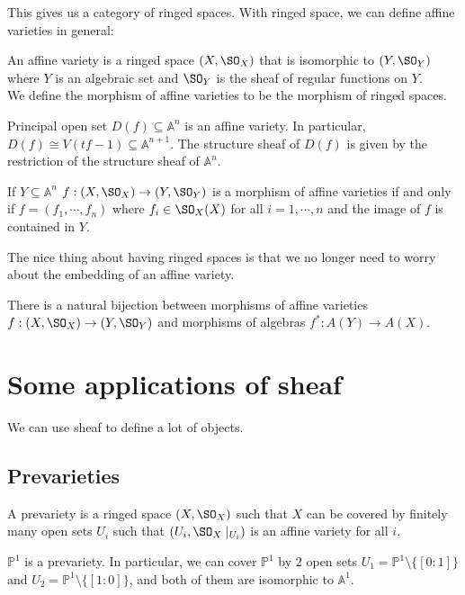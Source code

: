 \documentclass[12pt]{scrartcl}
\newcommand{\A}{\mathbb{A}}
\newcommand{\PP}{\mathbb{P}}
\begin{document}
This gives us a category of ringed spaces. With ringed space, we can define affine varieties in general: 
\begin{definition}
    An affine variety is a ringed space $(X,\SO_X)$ that is isomorphic to $(Y,\SO_Y)$ where $Y$ is an algebraic set and $\SO_Y$ is the sheaf of regular functions on $Y$.
    \\

    We define the morphism of affine varieties to be the morphism of ringed spaces.
\end{definition}
\begin{example}
    Principal open set $D(f)\subseteq \A^n$ is an affine variety. In particular, $D(f)\cong V(tf-1)\subseteq \A^{n+1}$. The structure sheaf of $D(f)$ is given by the restriction of the structure sheaf of $\A^n$. 
\end{example}
\begin{theorem}
    If $Y\subseteq \A^n$ $f:(X,\SO_X)\to (Y,\SO_Y)$ is a morphism of affine varieties if and only if $f=(f_1,\cdots,f_n)$ where $f_i\in \SO_X(X)$ for all $i=1,\cdots,n$ and the image of $f$ is contained in $Y$.
\end{theorem}
\begin{remark}
    The nice thing about having ringed spaces is that we no longer need to worry about the embedding of an affine variety. 
\end{remark}
\begin{theorem}
    There is a natural bijection between morphisms of affine varieties $f:(X,\SO_X)\to (Y,\SO_Y)$ and morphisms of algebras $f^*:A(Y)\to A(X)$.
\end{theorem}

\section{Some applications of sheaf}
We can use sheaf to define a lot of objects. 

\subsection{Prevarieties}
\begin{definition}
    A prevariety is a ringed space $(X,\SO_X)$ such that $X$ can be covered by finitely many open sets $U_i$ such that $(U_i,\SO_X\mid_{U_i})$ is an affine variety for all $i$.
\end{definition}
\begin{example}
    $\PP^1$ is a prevariety. In particular, we can cover $\PP^1$ by $2$ open sets $U_1=\PP^1\setminus \{[0:1]\}$ and $U_2=\PP^1\setminus \{[1:0]\}$, and both of them are isomorphic to $\A^1$.
\end{example}
\end{document}
